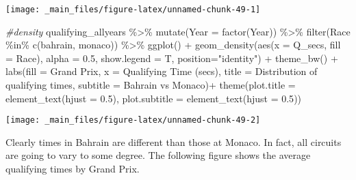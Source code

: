 \documentclass[
]{book}
\newenvironment{Shaded}{\begin{snugshade}}{\end{snugshade}}
\newcommand{\AttributeTok}[1]{\textcolor[rgb]{0.77,0.63,0.00}{#1}}
\newcommand{\CommentTok}[1]{\textcolor[rgb]{0.56,0.35,0.01}{\textit{#1}}}
\newcommand{\FloatTok}[1]{\textcolor[rgb]{0.00,0.00,0.81}{#1}}
\newcommand{\FunctionTok}[1]{\textcolor[rgb]{0.00,0.00,0.00}{#1}}
\newcommand{\NormalTok}[1]{#1}
\newcommand{\SpecialCharTok}[1]{\textcolor[rgb]{0.00,0.00,0.00}{#1}}
\newcommand{\StringTok}[1]{\textcolor[rgb]{0.31,0.60,0.02}{#1}}
\begin{document}
\begin{center}\texttt{[image: \_main\_files/figure-latex/unnamed-chunk-49-1]} \end{center}

\begin{Shaded}
\begin{Highlighting}[]
\CommentTok{\#density}
\NormalTok{qualifying\_allyears }\SpecialCharTok{\%\textgreater{}\%}
  \FunctionTok{mutate}\NormalTok{(}\AttributeTok{Year =} \FunctionTok{factor}\NormalTok{(Year)) }\SpecialCharTok{\%\textgreater{}\%}
  \FunctionTok{filter}\NormalTok{(Race }\SpecialCharTok{\%in\%} \FunctionTok{c}\NormalTok{(}\StringTok{\textquotesingle{}bahrain\textquotesingle{}}\NormalTok{, }\StringTok{\textquotesingle{}monaco\textquotesingle{}}\NormalTok{)) }\SpecialCharTok{\%\textgreater{}\%}
  \FunctionTok{ggplot}\NormalTok{() }\SpecialCharTok{+}
  \FunctionTok{geom\_density}\NormalTok{(}\FunctionTok{aes}\NormalTok{(}\AttributeTok{x =}\NormalTok{ Q\_secs, }\AttributeTok{fill =}\NormalTok{ Race),}
                 \AttributeTok{alpha =} \FloatTok{0.5}\NormalTok{, }\AttributeTok{show.legend =}\NormalTok{ T,}
                 \AttributeTok{position=}\StringTok{"identity"}\NormalTok{) }\SpecialCharTok{+}
  \FunctionTok{theme\_bw}\NormalTok{() }\SpecialCharTok{+}
  \FunctionTok{labs}\NormalTok{(}\AttributeTok{fill =} \StringTok{\textquotesingle{}Grand Prix\textquotesingle{}}\NormalTok{,}
       \AttributeTok{x =} \StringTok{\textquotesingle{}Qualifying Time (secs)\textquotesingle{}}\NormalTok{,}
       \AttributeTok{title =} \StringTok{\textquotesingle{}Distribution of qualifying times\textquotesingle{}}\NormalTok{,}
       \AttributeTok{subtitle =} \StringTok{\textquotesingle{}Bahrain vs Monaco\textquotesingle{}}\NormalTok{)}\SpecialCharTok{+}
  \FunctionTok{theme}\NormalTok{(}\AttributeTok{plot.title =} \FunctionTok{element\_text}\NormalTok{(}\AttributeTok{hjust =} \FloatTok{0.5}\NormalTok{),}
        \AttributeTok{plot.subtitle =} \FunctionTok{element\_text}\NormalTok{(}\AttributeTok{hjust =} \FloatTok{0.5}\NormalTok{)) }
\end{Highlighting}
\end{Shaded}

\begin{center}\texttt{[image: \_main\_files/figure-latex/unnamed-chunk-49-2]} \end{center}

Clearly times in Bahrain are different than those at Monaco. In fact, all circuits are going to vary to some degree. The following figure shows the average qualifying times by Grand Prix.
\end{document}
